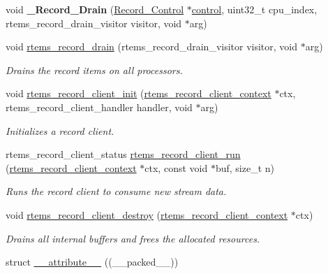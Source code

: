 \begin{DoxyCompactItemize}
\mbox{\label{group__RTEMSRecord_ga5d4257df1f4b734e97acc27a7e98d7ce}} 
void {\bfseries \+\_\+\+Record\+\_\+\+Drain} (\mbox{\hyperlink{structRecord__Control}{Record\+\_\+\+Control}} $\ast$\mbox{\hyperlink{structcontrol}{control}}, uint32\+\_\+t cpu\+\_\+index, rtems\+\_\+record\+\_\+drain\+\_\+visitor visitor, void $\ast$arg)
\item 
void \mbox{\hyperlink{group__RTEMSRecord_ga99ed015930e0cc3e9c1a802b80dacb69}{rtems\+\_\+record\+\_\+drain}} (rtems\+\_\+record\+\_\+drain\+\_\+visitor visitor, void $\ast$arg)
\begin{DoxyCompactList}\small\item\em Drains the record items on all processors. \end{DoxyCompactList}\item 
void \mbox{\hyperlink{group__RTEMSRecord_gaeaeb94639fc20eafbd68acf2f4b1d2c0}{rtems\+\_\+record\+\_\+client\+\_\+init}} (\mbox{\hyperlink{structrtems__record__client__context}{rtems\+\_\+record\+\_\+client\+\_\+context}} $\ast$ctx, rtems\+\_\+record\+\_\+client\+\_\+handler handler, void $\ast$arg)
\begin{DoxyCompactList}\small\item\em Initializes a record client. \end{DoxyCompactList}\item 
rtems\+\_\+record\+\_\+client\+\_\+status \mbox{\hyperlink{group__RTEMSRecord_gac8937bfa00c867421ef63b9aa1483b86}{rtems\+\_\+record\+\_\+client\+\_\+run}} (\mbox{\hyperlink{structrtems__record__client__context}{rtems\+\_\+record\+\_\+client\+\_\+context}} $\ast$ctx, const void $\ast$buf, size\+\_\+t n)
\begin{DoxyCompactList}\small\item\em Runs the record client to consume new stream data. \end{DoxyCompactList}\item 
void \mbox{\hyperlink{group__RTEMSRecord_ga897a2ca2557f532656e9676a60d5bc88}{rtems\+\_\+record\+\_\+client\+\_\+destroy}} (\mbox{\hyperlink{structrtems__record__client__context}{rtems\+\_\+record\+\_\+client\+\_\+context}} $\ast$ctx)
\begin{DoxyCompactList}\small\item\em Drains all internal buffers and frees the allocated resources. \end{DoxyCompactList}\item 
struct \mbox{\hyperlink{group__RTEMSRecord_gad09246453a4dabd919c7541484046a87}{\+\_\+\+\_\+attribute\+\_\+\+\_\+}} ((\+\_\+\+\_\+packed\+\_\+\+\_\+))

\end{DoxyCompactItemize}
